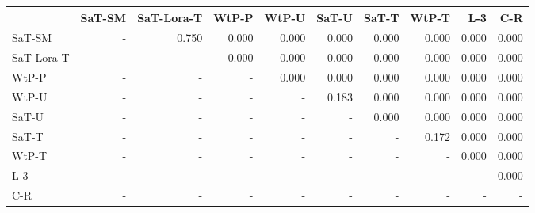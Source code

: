 \begin{tabular}{lrrrrrrrrr}
\toprule
 & SaT-SM & SaT-Lora-T & WtP-P & WtP-U & SaT-U & SaT-T & WtP-T & L-3 & C-R \\
\midrule
SaT-SM & - & 0.750 & 0.000 & 0.000 & 0.000 & 0.000 & 0.000 & 0.000 & 0.000 \\
SaT-Lora-T & - & - & 0.000 & 0.000 & 0.000 & 0.000 & 0.000 & 0.000 & 0.000 \\
WtP-P & - & - & - & 0.000 & 0.000 & 0.000 & 0.000 & 0.000 & 0.000 \\
WtP-U & - & - & - & - & 0.183 & 0.000 & 0.000 & 0.000 & 0.000 \\
SaT-U & - & - & - & - & - & 0.000 & 0.000 & 0.000 & 0.000 \\
SaT-T & - & - & - & - & - & - & 0.172 & 0.000 & 0.000 \\
WtP-T & - & - & - & - & - & - & - & 0.000 & 0.000 \\
L-3 & - & - & - & - & - & - & - & - & 0.000 \\
C-R & - & - & - & - & - & - & - & - & - \\
\bottomrule
\end{tabular}

